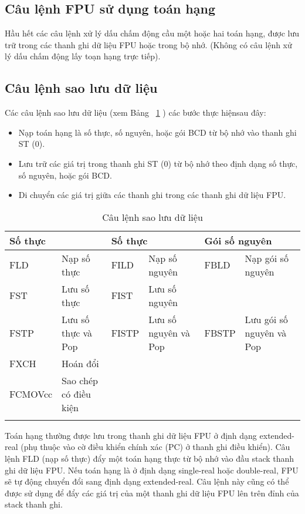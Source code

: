 		\subsection*{Câu lệnh FPU sử dụng toán hạng}
		Hầu hết các câu lệnh xử lý dấu chấm động cầu một hoặc hai toán hạng, được lưu trữ trong các thanh ghi dữ liệu FPU hoặc trong bộ nhớ. (Không có câu lệnh xử lý dấu chấm động lấy toạn hạng trực tiếp).
		
		\subsection*{ Câu lệnh sao lưu dữ liệu}
		Các câu lệnh sao lưu dữ liệu (xem Bảng ~\ref{tb:CauLenhSaoLuu} ) các bước thực hiệnsau đây:
		\begin{itemize}
			\renewcommand{\labelitemi}{\textbullet}
			\item Nạp toán hạng là số thực, số nguyên, hoặc gói BCD từ bộ nhớ vào thanh ghi ST (0).
			\item Lưu trữ các giá trị trong thanh ghi ST (0)  từ bộ nhớ theo định dạng số thực, số nguyên, hoặc gói BCD.
			\item  Di chuyển các giá trị giữa các thanh ghi trong các thanh ghi dữ liệu FPU.
		\end{itemize}		
		\begin{longtable}{|l|m{4cm}|l|m{3cm}|l|m{3cm}|}
			\hline
				\multicolumn{2}{|l|}{Số thực} & \multicolumn{2}{l|}{Số thực} & \multicolumn{2}{l|}{Gói số nguyên}\\
			\hline
			\hline
				FLD & Nạp số thực &  FILD & Nạp số nguyên &  FBLD & Nạp gói số nguyên  \\
				FST & Lưu số thực & FIST & Lưu số nguyên & & \\ 
				FSTP & Lưu số thực và Pop & FISTP & Lưu số nguyên và Pop & FBSTP  & Lưu gói số nguyên và Pop\\		    
				FXCH & Hoán đổi & & & & \\
				FCMOVcc & Sao chép có điều kiện  & & & &\\
			\hline
				\caption{Câu lệnh sao lưu dữ liệu}
				\label{tb:CauLenhSaoLuu}
		\end{longtable}

		Toán hạng thường được lưu trong thanh ghi dữ liệu FPU ở định dạng extended-real (phụ thuộc vào cờ điều khiển chính xác (PC) ở thanh ghi điều khiển). Câu lệnh FLD (nạp số thực) đẩy một toán hạng thực từ bộ nhớ vào đầu stack thanh ghi dữ liệu FPU. Nếu toán hạng là ở định dạng single-real hoặc double-real, FPU sẽ tự động chuyển đổi sang định dạng extended-real. Câu lệnh này cũng có thể được sử dụng để đẩy các giá trị của một thanh ghi dữ liệu FPU lên trên đỉnh của stack thanh ghi.\\
		
